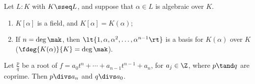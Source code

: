 \documentclass{article}
\begin{document}


\begin{ttheorem}
  Let \( L : K \) with \( K \sseq L \), and suppose that \( \alpha\in L \) is algebraic over \( K \).
  \begin{enumerate}[label=(\roman*)]
    \item \( K[\alpha] \) is a field, and \( K[\alpha] = K(\alpha) \);
    \item If \( n=\deg \mak \), then \( \lt\{ 1,\alpha,\alpha^2,\ldots,\alpha^{n-1} \rt\} \) is a basis for \( K(\alpha) \) over \( K \) (\imp \( \fdeg{K(\alpha)}{K}=\deg \mak \)).
  \end{enumerate}
\end{ttheorem}

\begin{ttheorem}
  Let \( \frac{p}{q} \) be a root of \( f= a_0t^n+\cdots + a_{n-1} t^{n-1} + a_n \), for \( a_j\in\Z \), where \( p\tand q \) are coprime.
  Then \( p\divs a_n \) and \( q\divs a_0 \).
\end{ttheorem}


\end{document}
